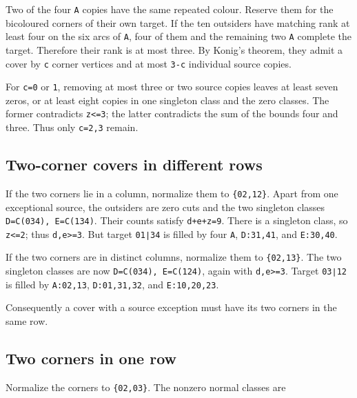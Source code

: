 \documentclass[
  10pt,
]{article}
\begin{document}
Two of the four \texttt{A} copies have the same repeated colour. Reserve
them for the bicoloured corners of their own target. If the ten
outsiders have matching rank at least four on the six arcs of
\texttt{A}, four of them and the remaining two \texttt{A} complete the
target. Therefore their rank is at most three. By Konig's theorem, they
admit a cover by \texttt{c} corner vertices and at most \texttt{3-c}
individual source copies.

For \texttt{c=0} or \texttt{1}, removing at most three or two source
copies leaves at least seven zeros, or at least eight copies in one
singleton class and the zero classes. The former contradicts
\texttt{z\textless{}=3}; the latter contradicts the sum of the bounds
four and three. Thus only \texttt{c=2,3} remain.

\hypertarget{two-corner-covers-in-different-rows}{%
\subsection*{Two-corner covers in different
rows}\label{two-corner-covers-in-different-rows}}

If the two corners lie in a column, normalize them to
\texttt{\{02,12\}}. Apart from one exceptional source, the outsiders are
zero cuts and the two singleton classes \texttt{D=C(034),\ E=C(134)}.
Their counts satisfy \texttt{d+e+z=9}. There is a singleton class, so
\texttt{z\textless{}=2}; thus \texttt{d,e\textgreater{}=3}. But target
\texttt{01∣34} is filled by four \texttt{A}, \texttt{D:31,41}, and
\texttt{E:30,40}.

If the two corners are in distinct columns, normalize them to
\texttt{\{02,13\}}. The two singleton classes are now
\texttt{D=C(034),\ E=C(124)}, again with \texttt{d,e\textgreater{}=3}.
Target \texttt{03∣12} is filled by \texttt{A:02,13},
\texttt{D:01,31,32}, and \texttt{E:10,20,23}.

Consequently a cover with a source exception must have its two corners
in the same row.

\hypertarget{two-corners-in-one-row}{%
\subsection*{Two corners in one row}\label{two-corners-in-one-row}}

Normalize the corners to \texttt{\{02,03\}}. The nonzero normal classes
are
\end{document}

